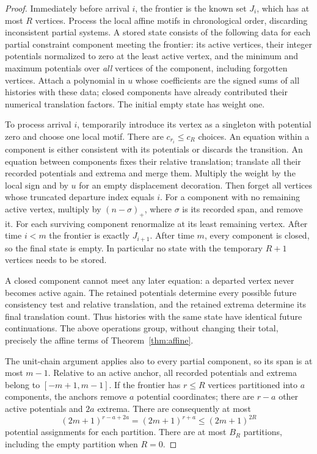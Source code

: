 \documentclass[11pt,a4paper]{article}
\begin{document}
\begin{proof}
Immediately before arrival $i$, the frontier is the known set $J_i$,
which has at most $R$ vertices. Process the local affine motifs in
chronological order, discarding inconsistent partial systems. A
stored state consists of the following data for each partial
constraint component meeting the frontier: its active vertices, their
integer potentials normalized to zero at the least active vertex,
and the minimum and maximum potentials over \emph{all} vertices of
the component, including forgotten vertices. Attach a polynomial in
$u$ whose coefficients are the signed sums of all histories with
these data; closed components have already contributed their
numerical translation factors. The initial empty state has weight
one.

To process arrival $i$, temporarily introduce its vertex as a
singleton with potential zero and choose one local motif. There are
$c_{r_i}\le c_R$ choices. An equation within a component is either
consistent with its potentials or discards the transition. An
equation between components fixes their relative translation;
translate all their recorded potentials and extrema and merge them.
Multiply the weight by the local sign and by $u$ for an empty
displacement decoration. Then forget all vertices whose truncated
departure index equals $i$. For a component with no remaining active
vertex, multiply by $(n-\sigma)_+$, where $\sigma$ is its recorded
span, and remove it. For each surviving component renormalize at its
least remaining vertex. After time $i<m$ the frontier is exactly
$J_{i+1}$. After time $m$, every component is closed, so the final
state is empty. In particular no state with the temporary $R+1$
vertices needs to be stored.

A closed component cannot meet any later equation: a departed vertex
never becomes active again. The retained potentials determine every
possible future consistency test and relative translation, and the
retained extrema determine its final translation count. Thus histories
with the same state have identical future continuations. The above
operations group, without changing their total, precisely the affine
terms of Theorem~\ref{thm:affine}.

The unit-chain argument applies also to every partial component, so
its span is at most $m-1$. Relative to an active anchor, all recorded
potentials and extrema belong to $[-m+1,m-1]$. If the frontier has
$r\le R$ vertices partitioned into $a$ components, the anchors remove
$a$ potential coordinates; there are $r-a$ other active potentials
and $2a$ extrema. There are consequently at most
\[
 (2m+1)^{r-a+2a}=(2m+1)^{r+a}\le(2m+1)^{2R}
\]
potential assignments for each partition. There are at most $B_R$
partitions, including the empty partition when $R=0$.


\end{proof}
\end{document}
